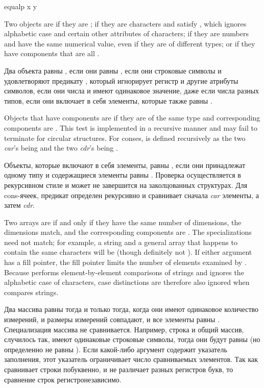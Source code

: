 \begin{defun}[Function]
\end{defun}

\begin{defun}[Function]
equalp x y

Two objects are  if they are ;
if they are characters and satisfy ,
which ignores alphabetic case and certain other attributes of characters;
if they are numbers and have the same numerical value,
even if they are of different types;
or if they have components that are all .

Два объекта равны , если они равны ,
если они строковые символы и удовлетворяют предикату , который
игнорирует регистр и другие атрибуты символов,
если они числа и имеют одинаковое значение, даже если числа разных типов,
если они включает в себя элементы, которые также равны .

Objects that have components are  if they are of the same
type and corresponding components are .
This test is implemented in a recursive manner and may fail to
terminate for circular structures.
For conses,  is defined recursively as
the two \emph{car}'s being  and the two \emph{cdr}'s being
.

Объекты, которые включают в себя элементы, равны , если они
принадлежат одному типу и содержащиеся элементы равны .
Проверка осуществляется в рекурсивном стиле и может не завершится на
заколцованных структурах.
Для cons-ячеек, предикат  определен рекурсивно и сравнивает сначала
\emph{car} элементы, а затем \emph{cdr}.

Two arrays are  if and only if they have the same
number of dimensions, the dimensions match,
and the corresponding components are .
The specializations need not match; for example,
a string and a general array that happens to contain the same characters
will be  (though definitely not ).
If either argument has a fill pointer, the fill pointer limits
the number of elements examined by .
Because  performs element-by-element comparisons
of strings and ignores the alphabetic case of characters,
case distinctions are therefore also ignored when  compares
strings.

Два массива равны  тогда и только тогда, когда они имеют одинаковое
количество измерений, и размеры измерений совпадают, и все элементы равны
. Специализация массива не сравнивается. Например,
строка и общий массив, случилось так, имеют одинаковые строковые символы,
тогда они будут равны  (но определенно не равны ).
Если какой-либо аргумент содержит указатель заполнения, этот указатель
ограничивает число сравниваемых элементов. Так как  сравнивает
строки побуквенно, и не различает разных регистров букв, то сравнение строк регистронезависимо.


\end{defun}
